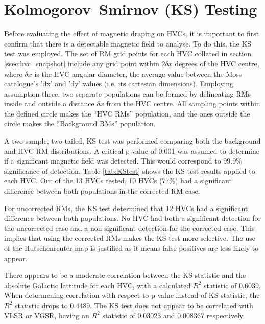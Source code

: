 \section{Kolmogorov–Smirnov (KS) Testing}
\label{sec:KStest}

Before evaluating the effect of magnetic draping on HVCs, it is important to first confirm that there is a detectable magnetic field to analyse. To do this, the KS test was employed. The set of RM grid points for each HVC collated in section \ref{ssec:hvc_snapshot} include any grid point within $2\delta x$ degrees of the HVC centre, where $\delta x$ is the HVC angular diameter, the average value between the Moss catalogue's 'dx' and 'dy' values (i.e. its cartesian dimensions). Employing assumption three, two separate populations can be formed by delineating RMs inside and outside a distance $\delta x$ from the HVC centre. All sampling points within the defined circle makes the “HVC RMs” population, and the ones outside the circle makes the “Background RMs” population.


A two-sample, two-tailed, KS test was performed comparing both the background and HVC RM distributions. A critical p-value of 0.001 was assumed to determine if a significant magnetic field was detected. This would correspond to 99.9\% significance of detection. Table \ref{tab:KStest} shows the KS test results applied to each HVC. Out of the 13 HVCs tested, 10 HVCs (77\%) had a significant difference between both populations in the corrected RM case.


For uncorrected RMs, the KS test determined that 12 HVCs had a significant difference between both populations. No HVC had both a significant detection for the uncorrected case and a non-significant detection for the corrected case. This implies that using the corrected RMs makes the KS test more selective. The use of the Hutschenreuter map is justified as it means false positives are less likely to appear.


There appears to be a moderate correlation between the KS statistic and the absolute Galactic lattitude for each HVC, with a calculated $R^2$ statistic of 0.6039. When determening correlation with respect to p-value instead of KS statistic, the $R^2$ statistic drops to 0.4489. The KS test does not appear to be correlated with VLSR or VGSR, having an $R^2$ statistic of 0.03023 and 0.008367 respectively.

